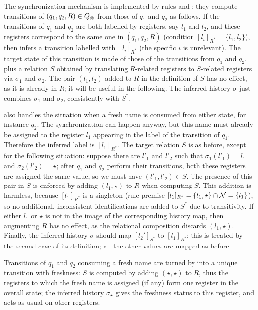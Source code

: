 The synchronization mechanism is implemented by rules \regrule{} and \allrule{}: they compute transitions of $(q_1,q_2,R) \in Q_{\otimes}$ from those of $q_1$ and $q_2$ as follows.
If the transitions of $q_1$ and $q_2$ are both labelled by registers, say $l_1$ and $l_2$, and these registers correspond to the same one in $(q_1,q_2,R)$ (condition $[l_i]_{R^*} = \{l_1,l_2\}$), then \regrule{} infers a transition labelled with $[l_i]_{R^*}$ (the specific $i$ is unrelevant). The target state of this transition is made of those of the transitions from $q_1$ and $q_2$, plus a relation $S$ obtained by translating $R$-related registers to $S$-related registers via $\sigma_1$ and $\sigma_2$. The pair $(l_1,l_2)$ added to $R$ in the definition of $S$ has no effect, as it is already in $R$; it will be useful in the following. The inferred history $\sigma$ just combines $\sigma_1$ and $\sigma_2$, consistently with $S^*$.

\regrule{} also handles the situation when a fresh name is consumed from either state, for instance $q_2$. The synchronization can happen anyway, but this name must already be assigned to the register $l_1$ appearing in the label of the transition of $q_1$. Therefore the inferred label is $[l_1]_{R^*}$. The target relation $S$ is as before, except for the following situation: suppose there are $l'_1$ and $l'_2$ such that $\sigma_1(l'_1) = l_1$ and $\sigma_2(l'_2) = \star$; after $q_1$ and $q_2$ perform their transitions, both these registers are assigned the same value, so we must have $(l'_1,l'_2) \in S$. The presence of this pair in $S$ is enforced by adding $(l_1,\star)$ to $R$ when computing $S$. This addition is harmless, because $[l_1]_{R^*}$ is a singleton (rule premise $[l_1]_{R^*} = \{l_1,\star\} \cap \mathcal{N} = \{l_1\}$), so no additional, inconsistent identifications are added to $S^*$ due to transitivity. If either $l_1$ or $\star$ is not in the image of the corresponding history map, then augmenting $R$ has no effect, as the relational composition discards $(l_1,\star)$. Finally, the inferred history $\sigma$ should map $[l_2']_{S^*}$ to $[l_1]_{R^*}$: this is treated by the second case of its definition; all the other values are mapped as before.

Transitions of $q_1$ and $q_2$ consuming a fresh name are turned by \allrule{} into a unique transition with freshness: $S$ is computed by adding $(\star,\star)$ to $R$, thus the registers to which the fresh name is assigned (if any) form one register in the overall state; the inferred history $\sigma_\star$ gives the freshness status to this register, and acts as usual on other registers.

